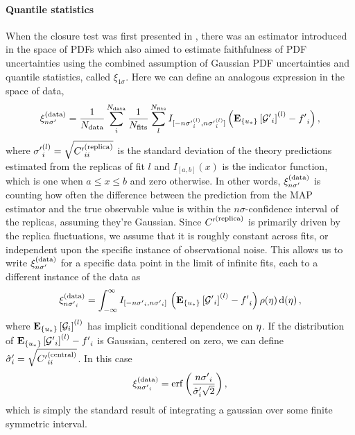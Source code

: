 \paragraph{Quantile statistics}
\label{sec:QuantileStatistics}

When the closure test was first presented in \cite{nnpdf30}, there was an estimator
introduced in the space of PDFs which also aimed to estimate faithfulness of
PDF uncertainties using the combined assumption of Gaussian PDF uncertainties
and quantile statistics, called $\xi_{1\sigma}$. Here we can define an
analogous expression in the space of data,
\begin{equation}
    \label{eq:XiDataDef}
    \xi^{(\rm data)}_{n {{\sigma}^{\prime}}} = 
        \frac{1}{N_{\rm data}} \sum_{i}^{N_{\rm data}} 
        \frac{1}{N_{\rm fits}} \sum_{l}^{N_{\rm fits}}
            I_{[-n {{\sigma}^{\prime}}_i^{(l)}, n {{\sigma}^{\prime}}_i^{(l)}]}
            \left( \mathbf{E}_{\{ u_* \}} \left[ {{\mathcal{G}}^{\prime}}_i \right]^{(l)} - {{f}^{\prime}}_i \right),
\end{equation}
where ${{\sigma}^{\prime}}_i^{(l)} = \sqrt{{{C}^{\prime}}^{(\rm replica)}_{ii}}$ is the standard deviation
of the theory predictions estimated from the replicas of fit $l$ and $I_{[a,
b]}(x)$ is the indicator function, which is one when $a \leq x \leq b$ and zero
otherwise. In other words, $\xi^{(\rm data)}_{n {{\sigma}^{\prime}}}$ is counting how often the difference
between the prediction from the MAP estimator and the true observable value is
within the $n\sigma$-confidence interval of the replicas, assuming they're
Gaussian. Since ${{C}^{\prime}}^{(\rm replica)}$ is primarily driven by the replica fluctuations, we
assume that it is roughly constant across fits, or independent upon the specific
instance of observational noise. This allows us to write $\xi^{(\rm data)}_{n {{\sigma}^{\prime}}}$ for a
specific data point in the limit of infinite fits, each to a different instance
of the data as
%
\begin{equation}
    \label{eq:XiIExpecVel}
        \xi^{(\rm data)}_{n {{{\sigma}^{\prime}}_i}} =
            \int_{-\infty}^{\infty} I_{[-n {{\sigma}^{\prime}}_i, n {{\sigma}^{\prime}}_i]}\,
            \left( \mathbf{E}_{\{ u_* \}} \left[ {{\mathcal{G}}^{\prime}}_i \right]^{(l)} - {{f}^{\prime}}_i \right) 
            \rho(\eta) \, 
            {\rm d}(\eta) \, ,
\end{equation}
%
where $\mathbf{E}_{\{ u_* \}} \left[ \mathcal{G}_i \right]^{(l)}$ has implicit conditional dependence on
$\eta$. If the distribution of \linebreak
$\mathbf{E}_{\{ u_* \}} \left[ {{\mathcal{G}}^{\prime}}_i \right]^{(l)} - {{f}^{\prime}}_i$ is Gaussian, centered
on zero, we can define ${{{ \hat{\sigma} }^{\prime}}}_i = \sqrt{{{C}^{\prime}}^{(\rm central)}_{ii}}$.
In this case
\begin{equation}
    \label{eq:expectedxi}
    \xi^{(\rm data)}_{n {{{\sigma}^{\prime}}_i}} =
    {\rm erf} \left( \frac{n {{\sigma}^{\prime}}_i}{{{\hat{\sigma}}^{\prime}}_i \sqrt{2}}\right),
\end{equation}
which is simply the standard result of integrating a gaussian over some finite
symmetric interval.


